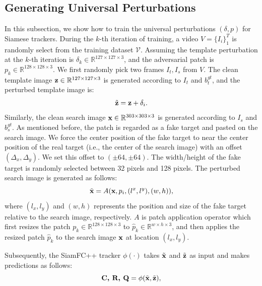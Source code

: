 \documentclass{article}
\begin{document}
\subsection{Generating Universal Perturbations}

In this subsection, we show how to train the universal perturbations $(\delta, p)$ for Siamese trackers.
During the $k$-th iteration of training, a video $V=\{I_i\}_1^T$ is randomly select from the training dataset $\mathcal V$. Assuming the template perturbation at the $k$-th iteration is $\delta_k \in \mathbb{R}^{127\times 127 \times 3}$, and the adversarial patch is $p_k \in \mathbb{R}^{128\times 128\times 3}$. We first randomly pick two frames $I_t, I_s$ from $V$.
The clean template image $\textbf z\in \mathbb{R}^{127\times 127 \times 3}$ is generated according to $I_t$ and $b^{gt}_t$, and the perturbed template image is:
\begin{equation}
\tilde {\textbf z} = \textbf z + \delta_i.
\end{equation}
Similarly, the clean search image $\textbf x \in \mathbb{R}^{303\times 303 \times 3}$ is generated according to $I_s$ and $b^{gt}_s$.
As mentioned before, the patch is regarded as a fake target and pasted on the search image. We force the center position of the fake target to near the center position of the real target (i.e., the center of the search image) with an offset $(\Delta_x, \Delta_y)$. We set this offset to $(\pm 64, \pm 64)$. The width/height of the fake target is randomly selected between 32 pixels and 128 pixels.
The perturbed search image is generated as follows:
\begin{equation}
\tilde{\textbf x} = A(\textbf x, p_i, (l^x, l^y), (w, h)),
\end{equation}
where $(l_x, l_y)$ and $(w, h)$ represents the position and size of the fake target relative to the search image, respectively. $A$ is patch application operator \cite{patch} which first resizes the patch $p_k \in \mathbb{R}^{128\times 128\times 3}$ to $\hat{p}_k \in \mathbb{R}^{w\times h\times 3}$, and then applies the resized patch $\hat{p}_k$ to the search image $\textbf x$ at location $(l_x,l_y)$.

Subsequently, the SiamFC++ tracker $\phi(\cdot)$ takes $\tilde {\textbf x}$ and $\tilde{\textbf  z}$ as input and makes predictions as follows:
\begin{equation}
\textbf{C, R, Q} = \phi(\tilde {\textbf x}, \tilde{\textbf  z}),
\end{equation}
\end{document}

